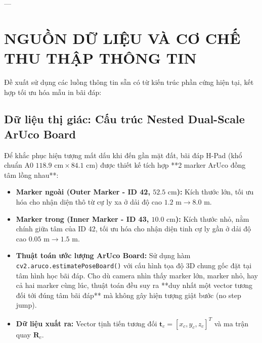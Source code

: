 \documentclass[12pt,a4paper]{article}
\begin{document}
---

\section{NGUỒN DỮ LIỆU VÀ CƠ CHẾ THU THẬP THÔNG TIN}
Đề xuất sử dụng các luồng thông tin sẵn có từ kiến trúc phần cứng hiện tại, kết hợp tối ưu hóa mẫu in bãi đáp:

\subsection{Dữ liệu thị giác: Cấu trúc Nested Dual-Scale ArUco Board}
Để khắc phục hiện tượng mất dấu khi đến gần mặt đất, bãi đáp H-Pad (khổ chuẩn A0 $118.9\text{ cm} \times 84.1\text{ cm}$) được thiết kế tích hợp **2 marker ArUco đồng tâm lồng nhau**:
\begin{itemize}[noitemsep,topsep=2pt]
    \item \textbf{Marker ngoài (Outer Marker - ID 42, $52.5\text{ cm}$):} Kích thước lớn, tối ưu hóa cho nhận diện thô từ cự ly xa ở dải độ cao $1.2\text{ m} \to 8.0\text{ m}$.
    \item \textbf{Marker trong (Inner Marker - ID 43, $10.0\text{ cm}$):} Kích thước nhỏ, nằm chính giữa tâm của ID 42, tối ưu hóa cho nhận diện tinh cự ly gần ở dải độ cao $0.05\text{ m} \to 1.5\text{ m}$.
    \item \textbf{Thuật toán ước lượng ArUco Board:} Sử dụng hàm \texttt{cv2.aruco.estimatePoseBoard()} với cấu hình tọa độ 3D chung gốc đặt tại tâm hình học bãi đáp. Cho dù camera nhìn thấy marker lớn, marker nhỏ, hay cả hai marker cùng lúc, thuật toán đều suy ra **duy nhất một vector tương đối tới đúng tâm bãi đáp** mà không gây hiện tượng giật bước (no step jump).
    \item \textbf{Dữ liệu xuất ra:} Vector tịnh tiến tương đối $\mathbf{t}_c = [x_c, y_c, z_c]^T$ và ma trận quay $\mathbf{R}_c$.
\end{itemize}
\end{document}
